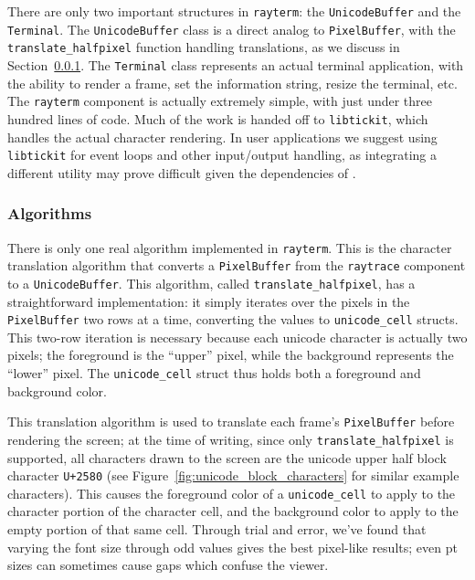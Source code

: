 There are only two important structures in \texttt{rayterm}: the \texttt{UnicodeBuffer} and the \texttt{Terminal}.
The \texttt{UnicodeBuffer} class is a direct analog to \texttt{PixelBuffer},
with the \texttt{translate\_halfpixel} function handling translations, as we discuss in Section~\ref{ch:methods:interface:tickit:algorithms}.
The \texttt{Terminal} class represents an actual terminal application, with the ability to render a frame, set the information string, resize the terminal, etc.
The \texttt{rayterm} component is actually extremely simple, with just under three hundred lines of code.
Much of the work is handed off to \texttt{libtickit}, which handles the actual character rendering.
In user applications we suggest using \texttt{libtickit} for event loops and other input/output handling, as integrating a different utility may prove difficult given the dependencies of \name.

\subsubsection{Algorithms} \label{ch:methods:interface:tickit:algorithms}

There is only one real algorithm implemented in \texttt{rayterm}.
This is the character translation algorithm that converts a \texttt{PixelBuffer} from the \texttt{raytrace} component to a \texttt{UnicodeBuffer}.
This algorithm, called \texttt{translate\_halfpixel}, has a straightforward implementation: it simply iterates over the pixels in the \texttt{PixelBuffer} two rows at a time, converting the values to \texttt{unicode\_cell} structs.
This two-row iteration is necessary because each unicode character is actually two pixels; the foreground is the ``upper'' pixel, while the background represents the ``lower'' pixel.
The \texttt{unicode\_cell} struct thus holds both a foreground and background color.

This translation algorithm is used to translate each frame's \texttt{PixelBuffer} before rendering the screen; at the time of writing, since only \texttt{translate\_halfpixel} is supported, all characters drawn to the screen are the unicode upper half block character \texttt{U+2580} (see Figure~\ref{fig:unicode_block_characters} for similar example characters).
This causes the foreground color of a \texttt{unicode\_cell} to apply to the character portion of the character cell, and the background color to apply to the empty portion of that same cell.
Through trial and error, we've found that varying the font size through odd values gives the best pixel-like results; even pt sizes can sometimes cause gaps which confuse the viewer.

